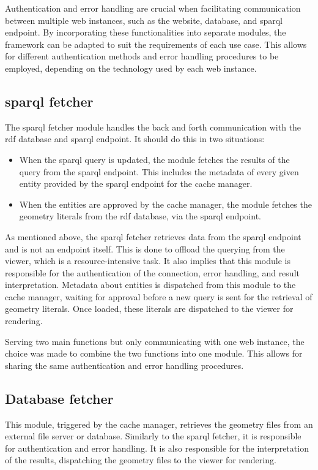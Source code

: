 Authentication and error handling are crucial when facilitating communication between multiple web instances, such as the website, database, and \ac{sparql} endpoint. By incorporating these functionalities into separate modules, the framework can be adapted to suit the requirements of each use case. This allows for different authentication methods and error handling procedures to be employed, depending on the technology used by each web instance.

\subsection{\acs{sparql} fetcher}
The \acs{sparql} fetcher module handles the back and forth communication with the \ac{rdf} database and \ac{sparql} endpoint. It should do this in two situations:

\begin{itemize}
    \item When the \ac{sparql} query is updated, the module fetches the results of the query from the \ac{sparql} endpoint. This includes the metadata of every given entity provided by the \ac{sparql} endpoint for the cache manager.
    \item When the entities are approved by the cache manager, the module fetches the geometry literals from the \ac{rdf} database, via the \ac{sparql} endpoint.
\end{itemize}

As mentioned above, the \ac{sparql} fetcher retrieves data from the \ac{sparql} endpoint and is not an endpoint itself. This is done to offload the querying from the viewer, which is a resource-intensive task. It also implies that this module is responsible for the authentication of the connection, error handling, and result interpretation. Metadata about entities is dispatched from this module to the cache manager, waiting for approval before a new query is sent for the retrieval of geometry literals. Once loaded, these literals are dispatched to the viewer for rendering.

Serving two main functions but only communicating with one web instance, the choice was made to combine the two functions into one module. This allows for sharing the same authentication and error handling procedures.

\subsection{Database fetcher} \label{sec:databaseFetcher}
This module, triggered by the cache manager, retrieves the geometry files from an external file server or database. Similarly to the \ac{sparql} fetcher, it is responsible for authentication and error handling. It is also responsible for the interpretation of the results, dispatching the geometry files to the viewer for rendering.

